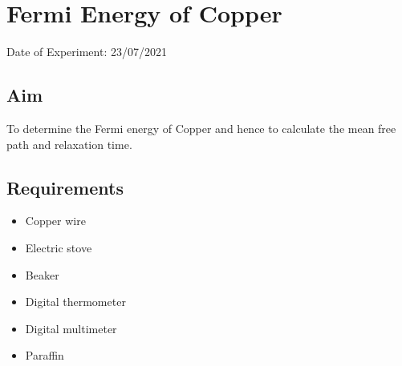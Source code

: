 


	
	\chapter{Fermi Energy of Copper} %
	\vspace{-1cm}
	
	\begin{center}%
		Date of Experiment: 23/07/2021
	\end{center}
	
	
	\section{Aim}
	To determine the Fermi energy of Copper and hence to calculate the mean free path and relaxation time.
	
	\section{Requirements}
	\begin{itemize}
		\item 	Copper wire
		\item 	Electric stove
		\item   Beaker
		\item   Digital thermometer
		\item   Digital multimeter
		\item   Paraffin
	\end{itemize}
	
